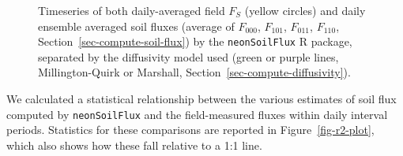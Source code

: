 \documentclass[
  letterpaper,
  DIV=11,
  numbers=noendperiod]{scrartcl}
\begin{document}
\begin{figure}


\caption{\label{fig-flux-results-year}Timeseries of both daily-averaged
field \(F_{S}\) (yellow circles) and daily ensemble averaged soil fluxes
(average of \(F_{000}\), \(F_{101}\), \(F_{011}\), \(F_{110}\),
Section~\ref{sec-compute-soil-flux}) by the \texttt{neonSoilFlux} R
package, separated by the diffusivity model used (green or purple lines,
Millington-Quirk or Marshall, Section~\ref{sec-compute-diffusivity}).}

\end{figure}%

We calculated a statistical relationship between the various estimates
of soil flux computed by \texttt{neonSoilFlux} and the field-measured
fluxes within daily interval periods. Statistics for these comparisons
are reported in Figure~\ref{fig-r2-plot}, which also shows how these
fall relative to a 1:1 line.
\end{document}
